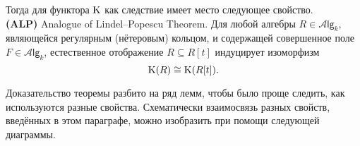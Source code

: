 \documentclass[oneside, 11pt]{amsart} \pdfoutput=1
\begin{document}
\begin{theorem}
Тогда для функтора ${\mathrm{K}}$ как следствие имеет место следующее свойство.\\
{\bf(ALP)} Analogue of Lindel--Popescu Theorem. Для любой алгебры $R\in\mathcal A\mathsf{lg}_k$, являющейся регулярным {\rm(}нётеровым{\rm)} кольцом, и содержащей совершенное поле $F\in\mathcal A\mathsf{lg}_k$, естественное отображение $R\subseteq R[t]$ индуцирует изоморфизм
$$
{\mathrm{K}}(R)\cong{\mathrm{K}}(R[t]).
$$
\end{theorem}

Доказательство теоремы разбито на ряд лемм, чтобы было проще следить, как используются разные свойства. Схематически взаимосвязь разных свойств, введённых в этом параграфе, можно изобразить при помощи следующей диаграммы.

\begin{center}
\end{center}
\end{document}
